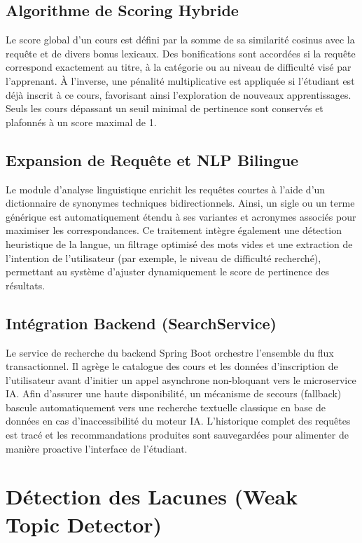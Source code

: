 \subsection{Algorithme de Scoring Hybride}

Le score global d'un cours est défini par la somme de sa similarité cosinus avec la requête et de divers bonus lexicaux. Des bonifications sont accordées si la requête correspond exactement au titre, à la catégorie ou au niveau de difficulté visé par l'apprenant. À l'inverse, une pénalité multiplicative est appliquée si l'étudiant est déjà inscrit à ce cours, favorisant ainsi l'exploration de nouveaux apprentissages. Seuls les cours dépassant un seuil minimal de pertinence sont conservés et plafonnés à un score maximal de 1.

\subsection{Expansion de Requête et NLP Bilingue}

Le module d'analyse linguistique enrichit les requêtes courtes à l'aide d'un dictionnaire de synonymes techniques bidirectionnels. Ainsi, un sigle ou un terme générique est automatiquement étendu à ses variantes et acronymes associés pour maximiser les correspondances. Ce traitement intègre également une détection heuristique de la langue, un filtrage optimisé des mots vides et une extraction de l'intention de l'utilisateur (par exemple, le niveau de difficulté recherché), permettant au système d'ajuster dynamiquement le score de pertinence des résultats.

\subsection{Intégration Backend (SearchService)}

Le service de recherche du backend Spring Boot orchestre l'ensemble du flux transactionnel. Il agrège le catalogue des cours et les données d'inscription de l'utilisateur avant d'initier un appel asynchrone non-bloquant vers le microservice IA. Afin d'assurer une haute disponibilité, un mécanisme de secours (fallback) bascule automatiquement vers une recherche textuelle classique en base de données en cas d'inaccessibilité du moteur IA. L'historique complet des requêtes est tracé et les recommandations produites sont sauvegardées pour alimenter de manière proactive l'interface de l'étudiant.

\section{Détection des Lacunes (Weak Topic Detector)}

